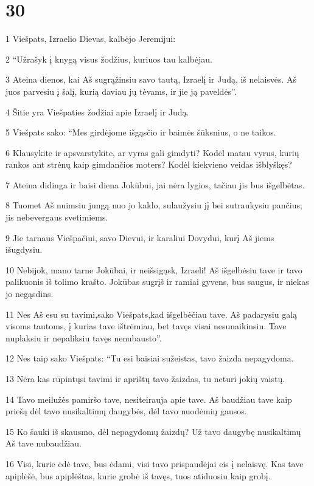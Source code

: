 \chapter{30}


\par 1 Viešpats, Izraelio Dievas, kalbėjo Jeremijui: 
\par 2 “Užrašyk į knygą visus žodžius, kuriuos tau kalbėjau. 
\par 3 Ateina dienos, kai Aš sugrąžinsiu savo tautą, Izraelį ir Judą, iš nelaisvės. Aš juos parvesiu į šalį, kurią daviau jų tėvams, ir jie ją paveldės”. 
\par 4 Šitie yra Viešpaties žodžiai apie Izraelį ir Judą. 
\par 5 Viešpats sako: “Mes girdėjome išgąsčio ir baimės šūksnius, o ne taikos. 
\par 6 Klausykite ir apsvarstykite, ar vyras gali gimdyti? Kodėl matau vyrus, kurių rankos ant strėnų kaip gimdančios moters? Kodėl kiekvieno veidas išblyškęs? 
\par 7 Ateina didinga ir baisi diena Jokūbui, jai nėra lygios, tačiau jis bus išgelbėtas. 
\par 8 Tuomet Aš nuimsiu jungą nuo jo kaklo, sulaužysiu jį bei sutraukysiu pančius; jis nebevergaus svetimiems. 
\par 9 Jie tarnaus Viešpačiui, savo Dievui, ir karaliui Dovydui, kurį Aš jiems išugdysiu. 
\par 10 Nebijok, mano tarne Jokūbai, ir neišsigąsk, Izraeli! Aš išgelbėsiu tave ir tavo palikuonis iš tolimo krašto. Jokūbas sugrįš ir ramiai gyvens, bus saugus, ir niekas jo negąsdins. 
\par 11 Nes Aš esu su tavimi,­sako Viešpats,­kad išgelbėčiau tave. Aš padarysiu galą visoms tautoms, į kurias tave ištrėmiau, bet tavęs visai nesunaikinsiu. Tave nuplaksiu ir nepaliksiu tavęs nenubausto”. 
\par 12 Nes taip sako Viešpats: “Tu esi baisiai sužeistas, tavo žaizda nepagydoma. 
\par 13 Nėra kas rūpintųsi tavimi ir aprištų tavo žaizdas, tu neturi jokių vaistų. 
\par 14 Tavo meilužės pamiršo tave, nesiteirauja apie tave. Aš baudžiau tave kaip priešą dėl tavo nusikaltimų daugybės, dėl tavo nuodėmių gausos. 
\par 15 Ko šauki iš skausmo, dėl nepagydomų žaizdų? Už tavo daugybę nusikaltimų Aš tave nubaudžiau. 
\par 16 Visi, kurie ėdė tave, bus ėdami, visi tavo prispaudėjai eis į nelaisvę. Kas tave apiplėšė, bus apiplėštas, kurie grobė iš tavęs, tuos atiduosiu kaip grobį. 
